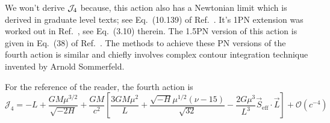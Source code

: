 We won't derive $\mathcal{J}_4$ because, this action also
has a Newtonian limit which is derived in graduate level texts; see
Eq.~(10.139) of Ref.~\cite{goldstein2013classical}. 
It's 1PN extension was worked out in Ref.~\cite{Damour:1988mr}, 
see Eq.~(3.10) therein. The 1.5PN version of this action is given 
in Eq.~(38) of Ref.~\cite{tanay2021integrability}.
The methods to achieve these PN versions of the fourth action
is similar and chiefly involves complex contour integration technique
invented by Arnold Sommerfeld.



For the reference of the reader, the fourth action is
\begin{equation}
\mathcal{J}_{4}=-L+\frac{G M \mu^{3 / 2}}{\sqrt{-2 H}}+\frac{G M}{c^{2}}\left[\frac{3 G M \mu^{2}}{L}+\frac{\sqrt{-H} \mu^{1 / 2}(\nu-15)}{\sqrt{32}}-\frac{2 G \mu^{3}}{L^{3}} \vec{S}_{\mathrm{eff}} \cdot \vec{L}\right]+\mathcal{O}\left(c^{-4}\right)
\end{equation}


















